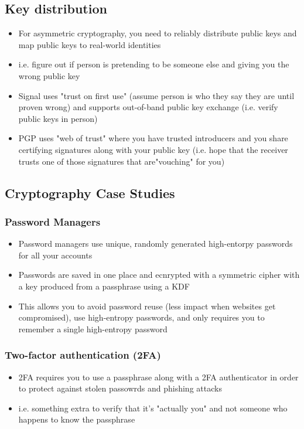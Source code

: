 \documentclass[letterpaper,12pt]{article}
\begin{document}
\subsection{Key distribution}
\begin{itemize}
 \item For asymmetric cryptography, you need to reliably distribute public keys and map public keys to real-world identities
 \item i.e. figure out if person is pretending to be someone else and giving you the wrong public key
 \item Signal uses "trust on first use" (assume person is who they say they are until proven wrong) and supports out-of-band public key exchange (i.e. verify public keys in person)
 \item PGP uses "web of trust" where you have trusted introducers and you share certifying signatures along with your public key (i.e. hope that the receiver trusts one of those signatures that are"vouching" for you)
\end{itemize}

\subsection{Cryptography Case Studies}

\subsubsection{Password Managers}
\begin{itemize}
 \item Password managers use unique, randomly generated high-entorpy passwords for all your accounts
 \item Passwords are saved in one place and ecnrypted with a symmetric cipher with a key produced from a passphrase using a KDF
 \item This allows you to avoid password reuse (less impact when websites get compromised), use high-entropy passwords, and only requires you to remember a single high-entropy password
\end{itemize}

\subsubsection{Two-factor authentication (2FA)}
\begin{itemize}
 \item 2FA requires you to use a passphrase along with a 2FA authenticator in order to protect against stolen passowrds and phishing attacks
 \item i.e. something extra to verify that it's "actually you" and not someone who happens to know the passphrase
\end{itemize}
\end{document}
